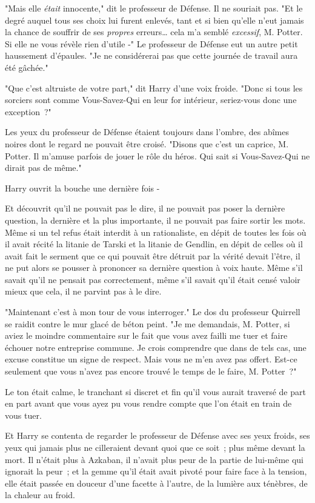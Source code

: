 "Mais elle \emph{était} innocente," dit le professeur de Défense. Il ne souriait pas. "Et le degré auquel tous ses choix lui furent enlevés, tant et si bien qu'elle n'eut jamais la chance de souffrir de ses \emph{propres} erreurs… cela m'a semblé \emph{excessif}, M. Potter. Si elle ne vous révèle rien d'utile -" Le professeur de Défense eut un autre petit haussement d'épaules. "Je ne considérerai pas que cette journée de travail aura été gâchée."

"Que c'est altruiste de votre part," dit Harry d'une voix froide. "Donc si tous les sorciers sont comme Vous-Savez-Qui en leur for intérieur, seriez-vous donc une exception~?"

Les yeux du professeur de Défense étaient toujours dans l'ombre, des abîmes noires dont le regard ne pouvait être croisé. "Disons que c'est un caprice, M. Potter. Il m'amuse parfois de jouer le rôle du héros. Qui sait si Vous-Savez-Qui ne dirait pas de même."

Harry ouvrit la bouche une dernière fois -

Et découvrit qu'il ne pouvait pas le dire, il ne pouvait pas poser la dernière question, la dernière et la plus importante, il ne pouvait pas faire sortir les mots. Même si un tel refus était interdit à un rationaliste, en dépit de toutes les fois où il avait récité la litanie de Tarski et la litanie de Gendlin, en dépit de celles où il avait fait le serment que ce qui pouvait être détruit par la vérité devait l'être, il ne put alors se pousser à prononcer sa dernière question à voix haute. Même s'il savait qu'il ne pensait pas correctement, même s'il savait qu'il était censé valoir mieux que cela, il ne parvint pas à le dire.

"Maintenant c'est à mon tour de vous interroger." Le dos du professeur Quirrell se raidit contre le mur glacé de béton peint. "Je me demandais, M. Potter, si aviez le moindre commentaire sur le fait que vous avez failli me tuer et faire échouer notre entreprise commune. Je crois comprendre que dans de tels cas, une excuse constitue un signe de respect. Mais vous ne m'en avez pas offert. Est-ce seulement que vous n'avez pas encore trouvé le temps de le faire, M. Potter~?"

Le ton était calme, le tranchant si discret et fin qu'il vous aurait traversé de part en part avant que vous ayez pu vous rendre compte que l'on était en train de vous tuer.

Et Harry se contenta de regarder le professeur de Défense avec ses yeux froids, ses yeux qui jamais plus ne cilleraient devant quoi que ce soit~; plus même devant la mort. Il n'était plus à Azkaban, il n'avait plus peur de la partie de lui-même qui ignorait la peur~; et la gemme qu'il était avait pivoté pour faire face à la tension, elle était passée en douceur d'une facette à l'autre, de la lumière aux ténèbres, de la chaleur au froid.

